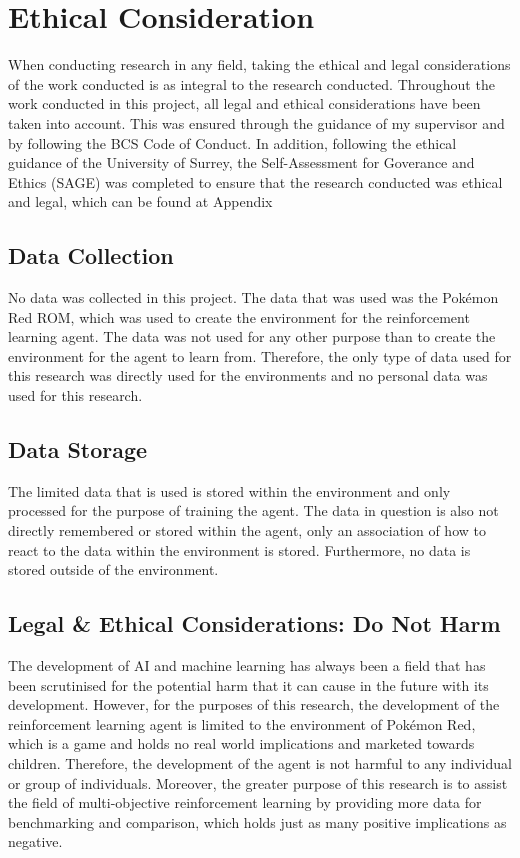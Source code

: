 \section{Ethical Consideration}

When conducting research in any field, taking the ethical and legal considerations of the work conducted is as integral to the research conducted. Throughout the work conducted in this project, all legal and ethical considerations have been taken into account. This was ensured through the guidance of my supervisor and by following the BCS Code of Conduct. In addition, following the ethical guidance of the University of Surrey, the Self-Assessment for Goverance and Ethics (SAGE) was completed to ensure that the research conducted was ethical and legal, which can be found at Appendix %

\subsection{Data Collection}

No data was collected in this project. The data that was used was the Pokémon Red ROM, which was used to create the environment for the reinforcement learning agent. The data was not used for any other purpose than to create the environment for the agent to learn from. Therefore, the only type of data used for this research was directly used for the environments and no personal data was used for this research.

\subsection{Data Storage}

The limited data that is used is stored within the environment and only processed for the purpose of training the agent. The data in question is also not directly remembered or stored within the agent, only an association of how to react to the data within the environment is stored. Furthermore, no data is stored outside of the environment. 

\subsection{Legal \& Ethical Considerations: Do Not Harm}

The development of AI and machine learning has always been a field that has been scrutinised for the potential harm that it can cause in the future with its development. However, for the purposes of this research, the development of the reinforcement learning agent is limited to the environment of Pokémon Red, which is a game and holds no real world implications and marketed towards children. Therefore, the development of the agent is not harmful to any individual or group of individuals. Moreover, the greater purpose of this research is to assist the field of multi-objective reinforcement learning by providing more data for benchmarking and comparison, which holds just as many positive implications as negative.

